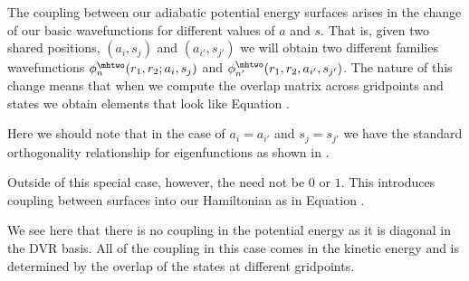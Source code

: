 %
%

The coupling between our adiabatic potential energy surfaces arises in the change of our basic \htwo{} wavefunctions for different values of $a$ and $s$. That is, given two shared \hplus{} positions, $(a_i, s_j)$ and $(a_{i'}, s_{j'})$ we will obtain two different \htwo{} families wavefunctions $\phi^{\mhtwo}_{n}(r_1, r_2 ; a_i, s_j)$ and $\phi^{\mhtwo}_{n'}(r_1, r_2, a_{i'}, s_{j'})$. The nature of this change means that when we compute the overlap matrix across gridpoints and states we obtain elements that look like Equation .


Here we should note that in the case of $a_{i}=a_{i'}$ and $s_{j}=s_{j'}$ we have the standard orthogonality relationship for eigenfunctions as shown in .


Outside of this special case, however, the need not be $0$ or $1$. This introduces coupling between surfaces into our Hamiltonian as in Equation .


We see here that there is no coupling in the potential energy as it is diagonal in the DVR basis. All of the coupling in this case comes in the kinetic energy and is determined by the overlap of the \htwo{} states at different gridpoints.

%
